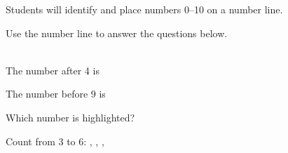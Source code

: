\documentclass{math_textbook}
\begin{document}
\begin{learningobjective}
Students will identify and place numbers 0–10 on a number line.
\end{learningobjective}

Use the number line to answer the questions below.\\[10pt]
\\[12pt]

\begin{practicegrid}
  \item The number after 4 is \blank
  \item The number before 9 is \blank
  \item Which number is highlighted? \blank
  \item Count from 3 to 6: \blank, \blank, \blank, \blank
\end{practicegrid}
\end{document}
